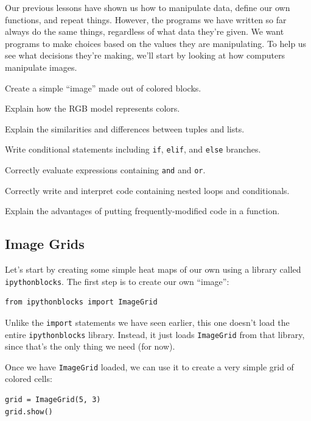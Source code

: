 \documentclass{book}
\begin{document}
Our previous lessons have shown us how to manipulate data, define our
own functions, and repeat things. However, the programs we have written
so far always do the same things, regardless of what data they're given.
We want programs to make choices based on the values they are
manipulating. To help us see what decisions they're making, we'll start
by looking at how computers manipulate images.

\begin{objectives}
\begin{swcitemize}
\item
  Create a simple ``image'' made out of colored blocks.
\item
  Explain how the RGB model represents colors.
\item
  Explain the similarities and differences between tuples and lists.
\item
  Write conditional statements including \texttt{if}, \texttt{elif}, and
  \texttt{else} branches.
\item
  Correctly evaluate expressions containing \texttt{and} and
  \texttt{or}.
\item
  Correctly write and interpret code containing nested loops and
  conditionals.
\item
  Explain the advantages of putting frequently-modified code in a
  function.
\end{swcitemize}
\end{objectives}

\subsection{Image Grids}

Let's start by creating some simple heat maps of our own using a library
called \texttt{ipythonblocks}. The first step is to create our own
``image'':

\begin{verbatim}
from ipythonblocks import ImageGrid
\end{verbatim}

Unlike the \texttt{import} statements we have seen earlier, this one
doesn't load the entire \texttt{ipythonblocks} library. Instead, it just
loads \texttt{ImageGrid} from that library, since that's the only thing
we need (for now).

Once we have \texttt{ImageGrid} loaded, we can use it to create a very
simple grid of colored cells:

\begin{verbatim}
grid = ImageGrid(5, 3)
grid.show()
\end{verbatim}
\end{document}
